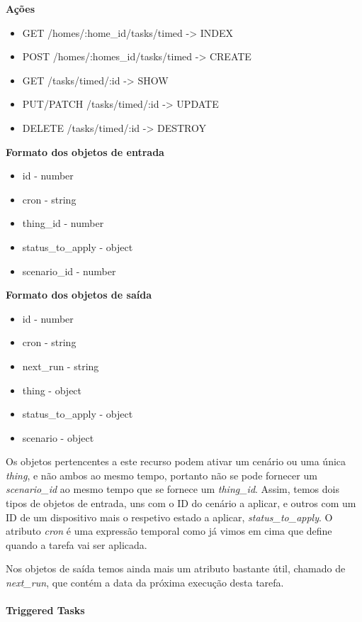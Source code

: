 \textbf{Ações}
\begin{itemize}
    \item GET /homes/:home{\_}id/tasks/timed -> INDEX
    \item POST /homes/:homes{\_}id/tasks/timed -> CREATE
    \item GET /tasks/timed/:id -> SHOW
    \item PUT/PATCH /tasks/timed/:id -> UPDATE
    \item DELETE /tasks/timed/:id -> DESTROY
\end{itemize}

\textbf{Formato dos objetos de entrada}
\begin{itemize}
    \item id - number
    \item cron - string
    \item thing{\_}id - number
    \item status{\_}to{\_}apply - object
    \item scenario{\_}id - number
\end{itemize}

\textbf{Formato dos objetos de saída}
\begin{itemize}
    \item id - number
    \item cron - string
    \item next{\_}run - string
    \item thing - object
    \item status{\_}to{\_}apply - object
    \item scenario - object
\end{itemize}

Os objetos pertencentes a este recurso podem ativar um cenário ou uma única \textit{thing}, e não ambos ao mesmo tempo, portanto não se pode fornecer um \textit{scenario{\_}id} ao mesmo tempo que se fornece um \textit{thing{\_}id}. Assim, temos dois tipos de objetos de entrada, uns com o ID do cenário a aplicar, e outros com um ID de um dispositivo mais o respetivo estado a aplicar, \textit{status{\_}to{\_}apply}. O atributo \textit{cron} é uma expressão temporal como já vimos em cima que define quando a tarefa vai ser aplicada.

Nos objetos de saída temos ainda mais um atributo bastante útil, chamado de \textit{next{\_}run}, que contém a data da próxima execução desta tarefa.

\paragraph*{Triggered Tasks}

